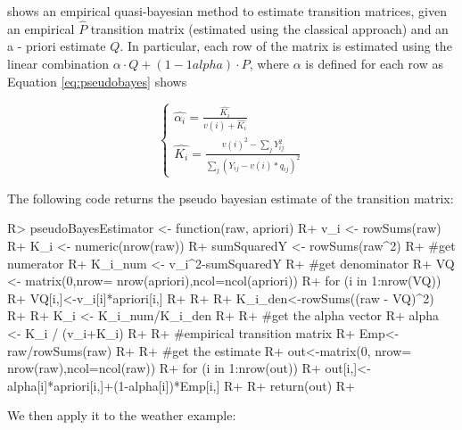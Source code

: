 \documentclass[
  nojss]{jss}
\begin{document}
\cite{Hu2002} shows an empirical quasi-bayesian method to estimate transition matrices, given an empirical \(\hat{P}\) transition matrix (estimated using the classical approach) and an a - priori estimate \(Q\). In particular, each row of the matrix is estimated using the linear combination \(\alpha \cdot Q+\left(1-1alpha\right) \cdot P\), where \(\alpha\) is defined for each row as Equation \ref{eq:pseudobayes} shows

\begin{equation}
\left\{\begin{matrix}
\hat{\alpha_i}=\frac{\hat{K_i}}{v\left(i \right )+\hat{K_i}}\\ 
\hat{K_i}=\frac{v\left(i \right)^2 - \sum_{j}Y_{ij}^2}{\sum_{j}(Y_{ij}-v\left(i \right)*q_{ij})^2}
\end{matrix}\right.
\label{eq:pseudobayes}
\end{equation}

The following code returns the pseudo bayesian estimate of the transition matrix:

\begin{CodeChunk}

\begin{CodeInput}
R> pseudoBayesEstimator <- function(raw, apriori){
R+   v_i <- rowSums(raw) 
R+   K_i <- numeric(nrow(raw))
R+   sumSquaredY <- rowSums(raw^2)
R+   #get numerator
R+   K_i_num <- v_i^2-sumSquaredY
R+   #get denominator
R+   VQ <- matrix(0,nrow= nrow(apriori),ncol=ncol(apriori))
R+   for (i in 1:nrow(VQ)) {
R+     VQ[i,]<-v_i[i]*apriori[i,]
R+   }
R+   
R+   K_i_den<-rowSums((raw - VQ)^2)
R+   
R+   K_i <- K_i_num/K_i_den
R+   
R+   #get the alpha vector
R+   alpha <- K_i / (v_i+K_i)
R+   
R+   #empirical transition matrix
R+   Emp<-raw/rowSums(raw)
R+   
R+   #get the estimate
R+   out<-matrix(0, nrow= nrow(raw),ncol=ncol(raw))
R+   for (i in 1:nrow(out)) {
R+     out[i,]<-alpha[i]*apriori[i,]+(1-alpha[i])*Emp[i,]
R+   }
R+   return(out)
R+ }
\end{CodeInput}
\end{CodeChunk}

We then apply it to the weather example:
\end{document}
